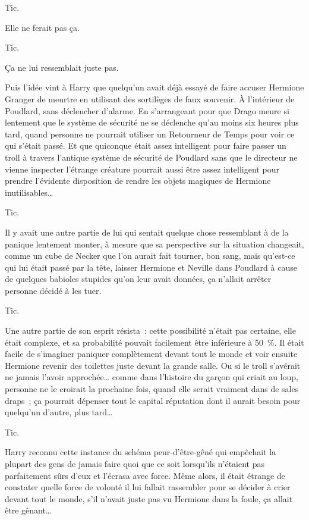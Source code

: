 Tic.

Elle ne ferait pas ça.

Tic.

Ça ne lui ressemblait juste pas.

Puis l'idée vint à Harry que quelqu'un avait déjà essayé de faire accuser Hermione Granger de meurtre en utilisant des sortilèges de faux souvenir. À l'intérieur de Poudlard, sans déclencher d'alarme. En s'arrangeant pour que Drago meure si lentement que le système de sécurité ne se déclenche qu'au moins six heures plus tard, quand personne ne pourrait utiliser un Retourneur de Temps pour voir ce qui s'était passé. Et que quiconque était assez intelligent pour faire passer un troll à travers l'antique système de sécurité de Poudlard sans que le directeur ne vienne inspecter l'étrange créature pourrait aussi être assez intelligent pour prendre l'évidente disposition de rendre les objets magiques de Hermione inutilisables…

Tic.

Il y avait une autre partie de lui qui sentait quelque chose ressemblant à de la panique lentement monter, à mesure que sa perspective sur la situation changeait, comme un cube de Necker que l'on aurait fait tourner, bon sang, mais qu'est-ce qui lui était passé par la tête, laisser Hermione et Neville dans Poudlard à cause de quelques babioles stupides qu'on leur avait données, ça n'allait arrêter personne décidé à les tuer.

Tic.

Une autre partie de son esprit résista~: cette possibilité n'était pas certaine, elle était complexe, et sa probabilité pouvait facilement être inférieure à 50~\%. Il était facile de s'imaginer paniquer complètement devant tout le monde et voir ensuite Hermione revenir des toilettes juste devant la grande salle. Ou si le troll s'avérait ne jamais l'avoir approchée… comme dans l'histoire du garçon qui criait au loup, personne ne le croirait la prochaine fois, quand elle serait vraiment dans de sales draps~; ça pourrait dépenser tout le capital réputation dont il aurait besoin pour quelqu'un d'autre, plus tard…

Tic.

Harry reconnu cette instance du schéma peur-d'être-gêné qui empêchait la plupart des gens de jamais faire quoi que ce soit lorsqu'ils n'étaient pas parfaitement sûrs d'eux et l'écrasa avec force. Même alors, il était étrange de constater quelle force de volonté il lui fallait rassembler pour se décider à crier devant tout le monde, s'il n'avait juste pas vu Hermione dans la foule, ça allait être gênant…

